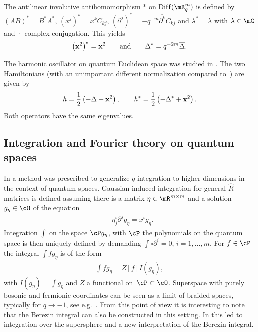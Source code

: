 The antilinear involutive antihomomorphism $\ast$ on ${\rm Dif\/f}(\mR^m_q)$ is def\/ined by $(AB)^\ast=B^\ast A^\ast$, $(x^j)^\ast=x^kC_{kj}$,  $(\partial^j)^\ast=-q^{-m}\overline{\partial^k}C_{kj}$ and $\lambda^\ast=\overline{\lambda}$ with $\lambda\in\mC$ and $\overline{\cdot}$ complex conjugation. This yields
\begin{gather*}
\big(\bold{x}^2\big)^\ast=\bold{x}^2 \qquad \mbox{and}\qquad \Delta^\ast=q^{-2m}\overline{\Delta}.
\end{gather*}

The harmonic oscillator on quantum Euclidean space was studied in \cite{MR1097174, MR1288667, MR1239953}. The two Hamiltonians (with an unimportant dif\/ferent normalization compared to~\cite{MR1239953}) are given by
\begin{gather}
\label{HOs}
h=\frac{1}{2}\left(-\Delta+\bold{x}^2\right),\qquad h^\ast=\frac{1}{2}\left(-{\Delta}^\ast+\bold{x}^2\right).
\end{gather}
Both operators have the same eigenvalues.


\subsection{Integration and Fourier theory on quantum spaces}
In \cite{MR1303081} a method was prescribed to generalize $q$-integration to higher dimensions in the context of quantum spaces. Gaussian-induced integration for general $\hat{R}$-matrices is def\/ined assuming there is a matrix $\eta\in\mR^{m\times m}$ and a solution $g_{\eta}\in\cO$ of the equation
\begin{gather}
\label{Gaussian}
-\eta^i_{ j}\partial^jg_{\eta}=x^i g_\eta.
\end{gather}
Integration $\int$ on the space $\cP g_{\eta}$, with $\cP$ the polynomials on the quantum space is then uniquely def\/ined by demanding $\int\circ \partial^i =0$, $i=1,\dots,m$. For $f\in\cP$ the integral $\int f g_{\eta}$ is of the form
\begin{gather}
\label{Gaussian2}
\int fg_{\eta}=Z[f]I(g_\eta),
\end{gather}
with $I(g_\eta)=\int g_\eta$ and $Z$ a functional on~$\cP\subset\cO$. Superspace with purely bosonic and fermionic coordinates can be seen as a limit of braided spaces, typically for $q\to-1$, see e.g.~\cite{MR1413908}. From this point of view it is interesting to note that the Berezin integral can also be constructed in this setting. In \cite{DBS5, MR2539324} this led to integration over the supersphere and a new interpretation of the Berezin integral.

